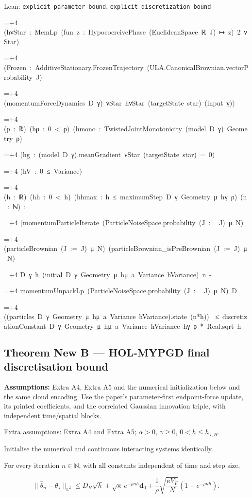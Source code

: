 \documentclass[11pt,a4paper]{report}
\newlength{\leancharwidth}
\newenvironment{leancode}{\par\smallskip\begingroup\ttfamily\footnotesize\raggedright
  \settowidth{\leancharwidth}{M}\setlength{\parskip}{0pt}\setlength{\parindent}{0pt}
  \frenchspacing}{\par\endgroup\smallskip}
\newcommand{\leanline}[2]{\hangindent=\dimexpr#1\leancharwidth+4\leancharwidth\relax
  \hangafter=1\noindent\hspace*{#1\leancharwidth}#2\par}
\begin{document}
\begin{leanbox}{Lean: \texttt{explicit\_\allowbreak{}parameter\_\allowbreak{}bound}, \texttt{explicit\_\allowbreak{}discretization\_\allowbreak{}bound}}
\begin{leancode}
\leanline{4}{(hνStar\ :\ MemLp\ (fun\ z\ :\ HypocoercivePhase\ (EuclideanSpace\ ℝ\ J)\ ↦\ z)\ 2\ νStar)}
\leanline{4}{(Frozen\ :\ AdditiveStationary.FrozenTrajectory\ (ULA.CanonicalBrownian.vectorProbability\ J)}
\leanline{6}{(momentumForceDynamics\ D\ γ)\ νStar\ hνStar\ (targetState\ star)\ (input\ γ))}
\leanline{4}{(ρ\ :\ ℝ)\ (hρ\ :\ 0\ <\ ρ)\ (hmono\ :\ TwistedJointMonotonicity\ (model\ D\ γ)\ Geometry\ ρ)}
\leanline{4}{(hg\ :\ (model\ D\ γ).meanGradient\ νStar\ (targetState\ star)\ =\ 0)}
\leanline{4}{(hV\ :\ 0\ ≤\ Variance)}
\leanline{4}{(h\ :\ ℝ)\ (hh\ :\ 0\ <\ h)\ (hhmax\ :\ h\ ≤\ maximumStep\ D\ γ\ Geometry\ μ\ hγ\ ρ)\ (n\ :\ ℕ)\ :}
\leanline{0}{‖momentumParticleIterate\ (ParticleNoiseSpace.probability\ (J\ :=\ J)\ μ\ N)}
\leanline{10}{(particleBrownian\ (J\ :=\ J)\ μ\ N)\ (particleBrownian\_isPreBrownian\ (J\ :=\ J)\ μ\ N)}
\leanline{10}{D\ γ\ h\ (initial\ D\ γ\ Geometry\ μ\ hμ\ a\ Variance\ hVariance)\ n\ -}
\leanline{10}{momentumUnpackLp\ (ParticleNoiseSpace.probability\ (J\ :=\ J)\ μ\ N)\ D}
\leanline{12}{((particles\ D\ γ\ Geometry\ μ\ hμ\ a\ Variance\ hVariance).state\ (n*h))‖\ ≤\ discretizationConstant\ D\ γ\ Geometry\ μ\ hμ\ a\ Variance\ hVariance\ hγ\ ρ\ *\ Real.sqrt\ h}
\end{leancode}
\end{leanbox}
\subsection{\texorpdfstring{Theorem New B — HOL-MYPGD final discretisation bound}{Theorem New B — HOL-MYPGD final discretisation bound}}


\textbf{Assumptions:} Extra A4, Extra A5 and the numerical initialization below and the same cloud encoding. Use the paper’s parameter-first endpoint-force update, its printed coefficients, and the correlated Gaussian innovation triple, with independent time/\allowbreak{}spatial blocks.

Extra assumptions: Extra A4 and Extra A5; \(\alpha>0\), \(\gamma\ge0\), \(0<h\le h_{\star,H}\).

Initialise the numerical and continuous interacting systems identically.





For every iteration \(n\in\mathbb N\), with all constants independent of time and step size,





\[\|\hat\theta_n-\theta_\star\|_{\mathrm L^2}\le D_H\sqrt h+\sqrt\kappa\,e^{-\rho nh}\mathbf d_0+\frac1\rho\sqrt{\frac{\kappa V_F}{N}}(1-e^{-\rho nh}).\]
\end{document}
